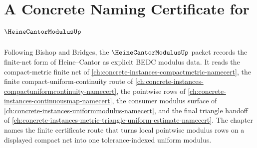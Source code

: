 \chapter{A Concrete Naming Certificate for $\HeineCantorModulusUp$}
\label{ch:concrete-instances-heine-cantor-modulus-namecert}

Following Bishop and Bridges, the $\HeineCantorModulusUp$ packet records the
finite-net form of Heine--Cantor as explicit BEDC modulus data. It reads the
compact-metric finite net of
\autoref{ch:concrete-instances-compactmetric-namecert}, the finite
compact-uniform-continuity route of
\autoref{ch:concrete-instances-compactuniformcontinuity-namecert}, the
pointwise rows of \autoref{ch:concrete-instances-continuousmap-namecert}, the
consumer modulus surface of
\autoref{ch:concrete-instances-uniformmodulus-namecert}, and the final
triangle handoff of
\autoref{ch:concrete-instances-metric-triangle-uniform-estimate-namecert}. The
chapter names the finite certificate route that turns local pointwise modulus
rows on a displayed compact net into one tolerance-indexed uniform modulus.

